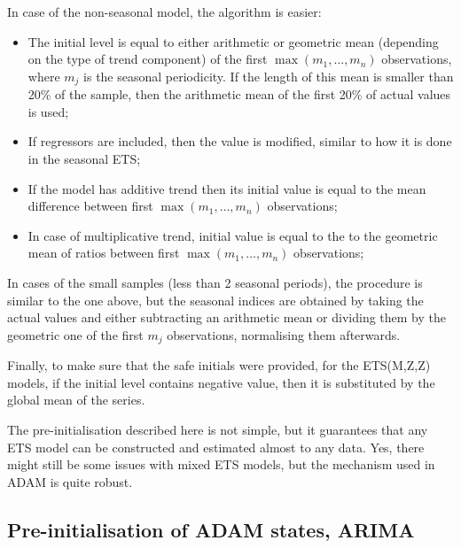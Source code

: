 \documentclass[
]{book}
\providecommand{\tightlist}{%
  \setlength{\itemsep}{0pt}\setlength{\parskip}{0pt}}
\theoremstyle{definition}
\theoremstyle{definition}
\theoremstyle{definition}
\theoremstyle{definition}
\theoremstyle{remark}
\begin{document}
In case of the non-seasonal model, the algorithm is easier:

\begin{itemize}
\tightlist
\item
  The initial level is equal to either arithmetic or geometric mean (depending on the type of trend component) of the first \(\max(m_1,\dots,m_n)\) observations, where \(m_j\) is the seasonal periodicity. If the length of this mean is smaller than 20\% of the sample, then the arithmetic mean of the first 20\% of actual values is used;
\item
  If regressors are included, then the value is modified, similar to how it is done in the seasonal ETS;
\item
  If the model has additive trend then its initial value is equal to the mean difference between first \(\max(m_1,\dots,m_n)\) observations;
\item
  In case of multiplicative trend, initial value is equal to the to the geometric mean of ratios between first \(\max(m_1,\dots,m_n)\) observations;
\end{itemize}

In cases of the small samples (less than 2 seasonal periods), the procedure is similar to the one above, but the seasonal indices are obtained by taking the actual values and either subtracting an arithmetic mean or dividing them by the geometric one of the first \(m_j\) observations, normalising them afterwards.

Finally, to make sure that the safe initials were provided, for the ETS(M,Z,Z) models, if the initial level contains negative value, then it is substituted by the global mean of the series.

The pre-initialisation described here is not simple, but it guarantees that any ETS model can be constructed and estimated almost to any data. Yes, there might still be some issues with mixed ETS models, but the mechanism used in ADAM is quite robust.

\hypertarget{pre-initialisation-of-adam-states-arima}{%
\subsection{Pre-initialisation of ADAM states, ARIMA}\label{pre-initialisation-of-adam-states-arima}}
\end{document}
